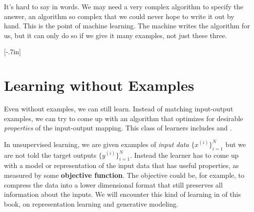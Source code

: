 It's hard to say in words. We may need a very complex algorithm to specify the answer, an algorithm so complex that we could never hope to write it out by hand. This is the point of machine learning. The machine writes the algorithm for us, but it can only do so if we give it many examples, not just these three.

[-.7in]

\section{Learning without Examples}

Even without examples, we can still learn. Instead of matching input-output examples, we can try to come up with an algorithm that optimizes for desirable \emph{properties} of the input-output mapping. This class of learners includes  and .


In unsupervised learning, we are given examples of \textit{input data} $\{x^{(i)}\}^N_{i=1}$ but we are not told the target outputs $\{y^{(i)}\}^N_{i=1}$. Instead the learner has to come up with a model or representation of the input data that has useful properties, as measured by some \textbf{objective function}. The objective could be, for example, to compress the data into a lower dimensional format that still preserves all information about the inputs. We will encounter this kind of learning in \partref{\ref{part:generative_models_and_representation_learning}} of this book, on representation learning and generative modeling.


